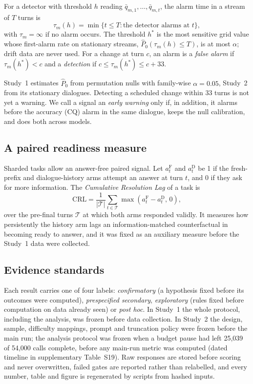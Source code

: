\begin{definition}
For a detector with threshold $h$ reading $\bar q_{m,1},\dots,\bar q_{m,t}$,
the alarm time in a stream of $T$ turns is
\begin{equation}
  \tau_m(h) = \min\{t\le T : \text{the detector alarms at } t\},
  \label{eq:alarm}
\end{equation}
with $\tau_m=\infty$ if no alarm occurs. The threshold $h^\ast$ is the most
sensitive grid value whose first-alarm rate on stationary streams,
$\widehat{P}_0(\tau_m(h)\le T)$, is at most $\alpha$; drift data are never used.
For a change at turn $c$, an alarm is a \emph{false alarm} if
$\tau_m(h^\ast)<c$ and a \emph{detection} if $c\le\tau_m(h^\ast)\le c+33$.
\end{definition}

Study~1 estimates $\widehat{P}_0$ from permutation nulls with family-wise
$\alpha=0.05$, Study~2 from its stationary dialogues. Detecting a scheduled
change within 33 turns is not yet a warning. We call a signal an \emph{early
warning} only if, in addition, it alarms before the accuracy (CQ) alarm in the
same dialogue, keeps the null calibration, and does both across models.

\subsection{A paired readiness measure}

Sharded tasks allow an answer-free paired signal. Let $a_t^{\mathrm{F}}$ and
$a_t^{\mathrm{D}}$ be 1 if the fresh-prefix and dialogue-history arms attempt an
answer at turn $t$, and 0 if they ask for more information. The
\emph{Cumulative Resolution Lag} of a task is
\begin{equation}
  \mathrm{CRL} = \frac{1}{|\mathcal{T}|}\sum_{t\in\mathcal{T}}
  \max\!\left(a_t^{\mathrm{F}}-a_t^{\mathrm{D}},\,0\right),
\end{equation}
over the pre-final turns $\mathcal{T}$ at which both arms responded validly. It
measures how persistently the history arm lags an information-matched
counterfactual in becoming ready to answer, and it was fixed as an auxiliary
measure before the Study~1 data were collected.

\subsection{Evidence standards}

Each result carries one of four labels: \emph{confirmatory} (a hypothesis fixed
before its outcomes were computed), \emph{prespecified secondary},
\emph{exploratory} (rules fixed before computation on data already seen) or
\emph{post hoc}. In Study~1 the whole protocol, including the analysis, was
frozen before data collection. In Study~2 the design, sample, difficulty
mappings, prompt and truncation policy were frozen before the main run; the
analysis protocol was frozen when a budget pause had left 25,039 of 54,000
calls complete, before any main-run metric was computed (dated timeline in
supplementary Table~S19). Raw responses are stored before
scoring and never overwritten, failed gates are reported rather than
relabelled, and every number, table and figure is regenerated by scripts from
hashed inputs.
